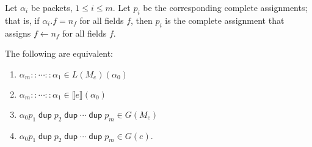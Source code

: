 \documentclass{article}
\newcommand\den[1]{\llbracket #1\rrbracket}
\newcommand\pdup{\mathop{\mathsf{dup}}}
\begin{document}
Let $\alpha_i$ be packets, $1\leq i\leq m$. Let $p_i$ be the corresponding complete assignments; that is, if $\alpha_i.f = n_f$ for all fields $f$, then $p_i$ is the complete assignment that assigns $f\leftarrow n_f$ for all fields $f$.

\begin{theorem}
The following are equivalent:
\begin{enumerate}
\romanize
\item
$\alpha_m::\cdots::\alpha_1 \in L(M_e)(\alpha_0)$
\item
$\alpha_m::\cdots::\alpha_1 \in \den{e}(\alpha_0)$
\item
$\alpha_0 p_1 \pdup p_2 \pdup \cdots \pdup p_m \in G(M_e)$
\item
$\alpha_0 p_1 \pdup p_2 \pdup \cdots \pdup p_m \in G(e)$.
\end{enumerate}
\end{theorem}
\end{document}
